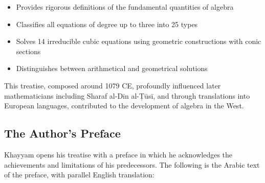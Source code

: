 \begin{itemize}
[noitemsep]
\item Provides rigorous definitions of the fundamental quantities of algebra
\item Classifies all equations of degree up to three into 25 types
\item Solves 14 irreducible cubic equations using geometric constructions with conic sections
\item Distinguishes between arithmetical and geometrical solutions

\end{itemize}
This treatise, composed around 1079 CE, profoundly influenced later mathematicians including Sharaf al-Dīn al-Ṭūsī, and through translations into European languages, contributed to the development of algebra in the West.

\subsection{The Author's Preface}

\label{subsec:preface}
Khayyam opens his treatise with a preface in which he acknowledges the achievements and limitations of his predecessors.
The following is the Arabic text of the preface, with parallel English translation:

